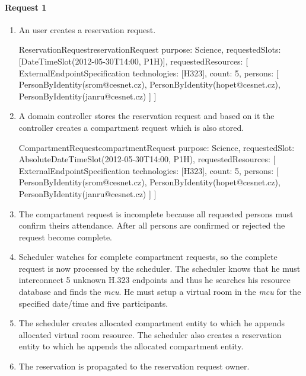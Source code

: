 \paragraph{Request 1}
\begin{enumerate}
\item An user creates a reservation request.

\begin{EntityExample}{ReservationRequest}{reservationRequest}{}
purpose: Science,
requestedSlots: [DateTimeSlot(2012-05-30T14:00, P1H)],
requestedResources: [
  ExternalEndpointSpecification {
    technologies: [H323],
    count: 5,
    persons: [
      PersonByIdentity(srom@cesnet.cz),
      PersonByIdentity(hopet@cesnet.cz),
      PersonByIdentity(janru@cesnet.cz)
    ]
  }
]
\end{EntityExample}

\item A domain controller stores the reservation request and based on it the controller creates a compartment request which is also stored.

\begin{EntityExample}{CompartmentRequest}{compartmentRequest}{}
purpose: Science,
requestedSlot: AbsoluteDateTimeSlot(2012-05-30T14:00, P1H),
requestedResources: [
  ExternalEndpointSpecification {
    technologies: [H323],
    count: 5,
    persons: [
      PersonByIdentity(srom@cesnet.cz),
      PersonByIdentity(hopet@cesnet.cz),
      PersonByIdentity(janru@cesnet.cz)
    ]
  }
]
\end{EntityExample}

\item The compartment request is incomplete because all requested persons must
confirm theirs attendance. After all persons are confirmed or rejected
the request become complete.

\item Scheduler watches for complete compartment requests, so the complete 
request is now processed by the scheduler. The scheduler knows that he must 
interconnect 5 unknown H.323 endpoints and thus he searches his resource 
database and finds the \emph{mcu}. He must setup a virtual room in the 
\emph{mcu} for the specified date/time and five participants.

\item The scheduler creates allocated compartment entity to which he appends 
allocated virtual room resource. The scheduler also creates a reservation
entity to which he appends the allocated compartment entity.

\item The reservation is propagated to the reservation request owner.


\end{enumerate}
